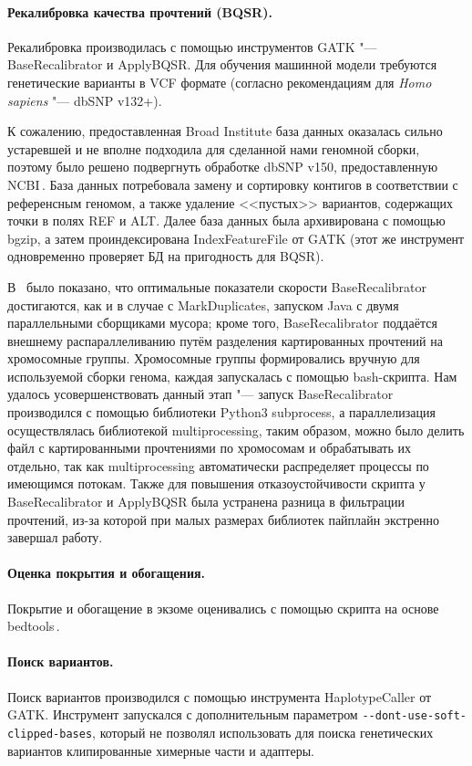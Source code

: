 \documentclass[a4paper,14pt]{extarticle}
\begin{document}
\paragraph{Рекалибровка качества прочтений (BQSR).}
Рекалибровка производилась с помощью инструментов GATK "--- BaseRecalibrator и ApplyBQSR.
Для обучения машинной модели требуются генетические варианты в VCF формате (согласно рекомендациям для \textit{Homo sapiens} "--- dbSNP v132+).

К сожалению, предоставленная Broad Institute база данных оказалась сильно устаревшей и не вполне подходила для сделанной нами геномной сборки, поэтому было решено подвергнуть обработке dbSNP v150, предоставленную NCBI\,\cite{Sherry_2001}.
База данных потребовала замену и сортировку контигов в соответствии с референсным геномом, а также удаление <<пустых>> вариантов, содержащих точки в полях REF и ALT.
Далее база данных была архивирована с помощью bgzip, а затем проиндексирована IndexFeatureFile от GATK (этот же инструмент одновременно проверяет БД на пригодность для BQSR).

В \,\cite{Heldenbrand_2019} было показано, что оптимальные показатели скорости BaseRecalibrator достигаются, как и в случае с MarkDuplicates, запуском Java с двумя параллельными сборщиками мусора;
кроме того, BaseRecalibrator поддаётся внешнему распараллеливанию путём разделения картированных прочтений на хромосомные группы.
Хромосомные группы формировались вручную для используемой сборки генома, каждая запускалась с помощью bash-скрипта.
Нам удалось усовершенствовать данный этап "--- запуск BaseRecalibrator производился с помощью библиотеки Python3 subprocess, а параллелизация осуществлялась библиотекой multiprocessing, таким образом, можно было делить файл с картированными прочтениями по хромосомам и обрабатывать их отдельно, так как multiprocessing автоматически распределяет процессы по имеющимся потокам.
Также для повышения отказоустойчивости скрипта у BaseRecalibrator и ApplyBQSR была устранена разница в фильтрации прочтений, из-за которой при малых размерах библиотек пайплайн экстренно завершал работу.

\paragraph{Оценка покрытия и обогащения.}
Покрытие и обогащение в экзоме оценивались с помощью скрипта на основе bedtools\,\cite{Quinlan_2010}.

\paragraph{Поиск вариантов.}
Поиск вариантов производился с помощью инструмента HaplotypeCaller от GATK.
Инструмент запускался с дополнительным параметром \verb|--dont-use-soft-clipped-bases|, который не позволял использовать для поиска генетических вариантов клипированные химерные части и адаптеры.
\end{document}

